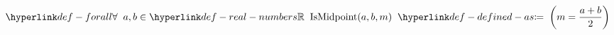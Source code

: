 
\hypertarget{def-interval-midpoint}{}
\begin{definition}
\[
\TerForall a, b \in \RealNumbers
\mathrm{IsMidpoint}(a, b, m) \TermDefinedAs \left( m = \frac{a + b}{2} \right)
\]
\end{definition}